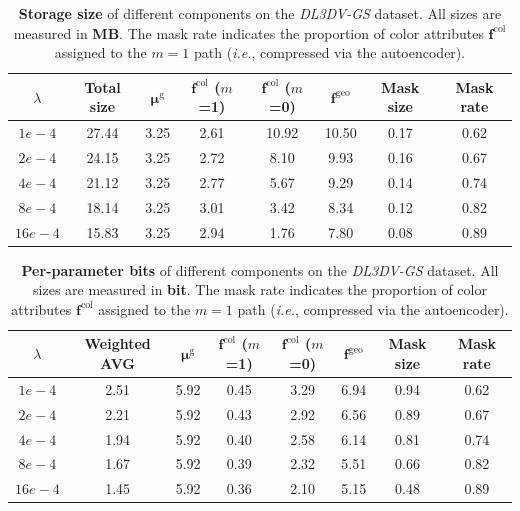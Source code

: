\documentclass{article} %
\newcommand{\ie}{\textit{i.e.}}
\begin{document}
\begin{table}[H]
    \normalsize
    \centering
    \caption{\textbf{Storage size} of different components on the \textit{DL3DV-GS} dataset. All sizes are measured in \textbf{MB}. The mask rate indicates the proportion of color attributes $\bm{f}^{\text{col}}$ assigned to the $m=1$ path (\ie, compressed via the autoencoder).}
    \vspace{5pt}
    \renewcommand{\arraystretch}{1.20}
    \setlength{\tabcolsep}{6pt}  
    \begin{tabular}{c|c|ccccc|c}
        \toprule[2pt]
        $\lambda$   & Total size   & $\bm{\mu}^\text{g}$ & $\bm{f}^{\text{col}}$ ($m$=1) & $\bm{f}^{\text{col}}$ ($m$=0) & $\bm{f}^{\text{geo}}$ & Mask size & Mask rate \\ \toprule
        $1e-4$ & 27.44 & 3.25     & 2.61           & 10.92          & 10.50    & 0.17      & 0.62      \\
        $2e-4$ & 24.15 & 3.25     & 2.72           & 8.10           & 9.93     & 0.16      & 0.67      \\
        $4e-4$ & 21.12 & 3.25     & 2.77           & 5.67           & 9.29     & 0.14      & 0.74      \\
        $8e-4$ & 18.14 & 3.25     & 3.01           & 3.42           & 8.34     & 0.12      & 0.82      \\
        $16e-4$ & 15.83 & 3.25     & 2.94           & 1.76           & 7.80     & 0.08      & 0.89      \\ \bottomrule[2pt]
    \end{tabular}
\end{table}

\begin{table}[H]
    \normalsize
    \centering
    \caption{\textbf{Per-parameter bits} of different components on the \textit{DL3DV-GS} dataset. All sizes are measured in \textbf{bit}. The mask rate indicates the proportion of color attributes $\bm{f}^{\text{col}}$ assigned to the $m=1$ path (\ie, compressed via the autoencoder).}
    \vspace{5pt}
    \renewcommand{\arraystretch}{1.20}
    \setlength{\tabcolsep}{6pt}  
    \begin{tabular}{c|c|ccccc|c}
        \toprule[2pt]
        $\lambda$   & Weighted AVG   & $\bm{\mu}^\text{g}$ & $\bm{f}^{\text{col}}$ ($m$=1) & $\bm{f}^{\text{col}}$ ($m$=0) & $\bm{f}^{\text{geo}}$ & Mask size & Mask rate \\ \toprule
        $1e-4$ & 2.51 & 5.92 & 0.45 & 3.29 & 6.94 & 0.94 & 0.62      \\
        $2e-4$ & 2.21 & 5.92 & 0.43 & 2.92 & 6.56 & 0.89 & 0.67      \\
        $4e-4$ & 1.94 & 5.92 & 0.40 & 2.58 & 6.14 & 0.81 & 0.74      \\
        $8e-4$ & 1.67 & 5.92 & 0.39 & 2.32 & 5.51 & 0.66 & 0.82      \\
        $16e-4$ & 1.45 & 5.92 & 0.36 & 2.10 & 5.15 & 0.48 & 0.89      \\ \bottomrule[2pt]
    \end{tabular}
    \label{tab:per_param_size}
\end{table}
\clearpage
\end{document}
